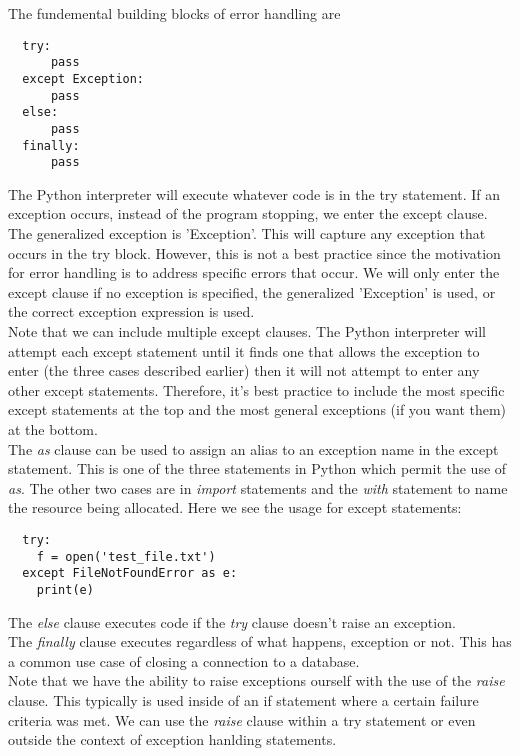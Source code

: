 \documentclass{article}%
\begin{document}
The fundemental building blocks of error handling are
\begin{lstlisting}
  try:
      pass
  except Exception:
      pass
  else:
      pass
  finally:
      pass
\end{lstlisting}
The Python interpreter will execute whatever code is in the try statement. If an exception occurs, instead of the program stopping, we enter the except clause.
The generalized exception is 'Exception'. This will capture any exception that occurs in the try block. However, this is not a best practice since the motivation 
for error handling is to address specific errors that occur. We will only enter the except clause if no exception is specified, the generalized 'Exception' is used, or the correct exception expression is used. \\

Note that we can include multiple except clauses. The Python interpreter will attempt each except statement until it finds one that allows the exception to enter (the three cases described earlier) then it will not attempt to enter any
other except statements. Therefore, it's best practice to include the most specific except statements at the top and the most general exceptions (if you want them) at the bottom. \\

The \textit{as} clause can be used to assign an alias to an exception name in the except statement. This is one of the three statements in Python which permit the use of \textit{as}.
The other two cases are in \textit{import} statements and the \textit{with} statement to name the resource being allocated. Here we see the usage for except statements:

\begin{lstlisting}
  try:
    f = open('test_file.txt')
  except FileNotFoundError as e:
    print(e)
\end{lstlisting}

The \textit{else} clause executes code if the \textit{try} clause doesn't raise an exception. \\

The \textit{finally} clause executes regardless of what happens, exception or not. This has a common use case of closing a connection to a database. \\

Note that we have the ability to raise exceptions ourself with the use of the \textit{raise} clause. This typically is used inside of an if statement where a certain failure criteria was met.
We can use the \textit{raise} clause within a try statement or even outside the context of exception hanlding statements. \\ \\
\end{document}
